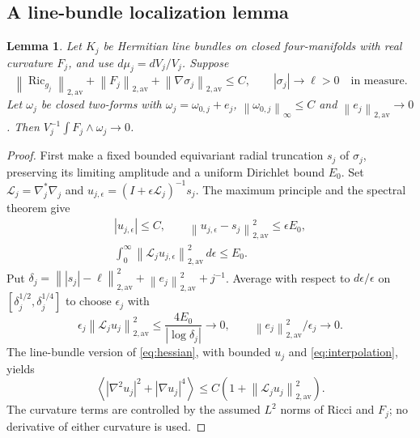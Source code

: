 \documentclass[11pt,a4paper]{article}
\newtheorem{lemma}[theorem]{Lemma}
\theoremstyle{definition}
\theoremstyle{remark}
\newcommand{\Ric}{\operatorname{Ric}}
\newcommand{\norm}[1]{\left\lVert#1\right\rVert}
\newcommand{\av}[1]{\left\langle#1\right\rangle}
\begin{document}
\subsection{A line-bundle localization lemma}
\begin{lemma}\label{lem:chern}
Let $K_j$ be Hermitian line bundles on closed four-manifolds with real curvature $F_j$, and use $d\mu_j=dV_j/V_j$. Suppose
\[
 \norm{\Ric_{g_j}}_{2,\mathrm{av}}+\norm{F_j}_{2,\mathrm{av}}
 +\norm{\nabla\sigma_j}_{2,\mathrm{av}}\le C,
 \qquad |\sigma_j|\to\ell>0\quad\text{in measure}.
\]
Let $\omega_j$ be closed two-forms with $\omega_j=\omega_{0,j}+e_j$,
$\norm{\omega_{0,j}}_\infty\le C$ and $\norm{e_j}_{2,\mathrm{av}}\to0$.
Then $V_j^{-1}\int F_j\wedge\omega_j\to0$.
\end{lemma}
\begin{proof}
First make a fixed bounded equivariant radial truncation $s_j$ of $\sigma_j$, preserving its limiting amplitude and a uniform Dirichlet bound $E_0$. Set $\mathscr L_j=\nabla_j^*\nabla_j$ and $u_{j,\epsilon}=(I+\epsilon\mathscr L_j)^{-1}s_j$. The maximum principle and the spectral theorem give
\begin{gather*}
 |u_{j,\epsilon}|\le C,\qquad
 \norm{u_{j,\epsilon}-s_j}_{2,\mathrm{av}}^2\le\epsilon E_0,\\
 \int_0^\infty\norm{\mathscr L_j u_{j,\epsilon}}_{2,\mathrm{av}}^2\,d\epsilon
 \le E_0.
\end{gather*}
Put $\delta_j=\norm{|s_j|-\ell}_{2,\mathrm{av}}^2+\norm{e_j}_{2,\mathrm{av}}^2+j^{-1}$. Average with respect to $d\epsilon/\epsilon$ on $[\delta_j^{1/2},\delta_j^{1/4}]$ to choose $\epsilon_j$ with
\begin{equation}
 \epsilon_j\norm{\mathscr L_j u_j}_{2,\mathrm{av}}^2
 \le\frac{4E_0}{|\log\delta_j|}\to0,
 \qquad \norm{e_j}_{2,\mathrm{av}}^2/\epsilon_j\to0.
 \label{eq:logscale}
\end{equation}
The line-bundle version of \eqref{eq:hessian}, with bounded $u_j$ and \eqref{eq:interpolation}, yields
\[
 \av{|\nabla^2u_j|^2+|\nabla u_j|^4}
 \le C\left(1+\norm{\mathscr L_j u_j}_{2,\mathrm{av}}^2\right).
\]
The curvature terms are controlled by the assumed $L^2$ norms of Ricci and $F_j$; no derivative of either curvature is used.


\end{proof}
\end{document}
